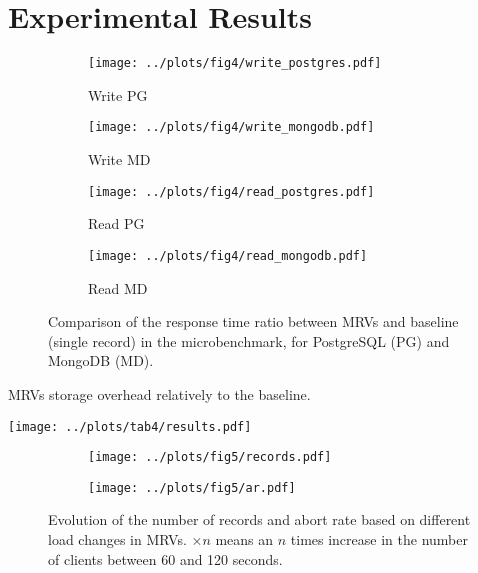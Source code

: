\documentclass[border=2cm]{standalone}
\begin{document}
\begin{minipage}{17cm}

\section*{Experimental Results}

\setcounter{figure}{3}
\begin{figure}[h]
    \centering
    \begin{subfigure}{.245\linewidth}
        \centering
        \texttt{[image: ../plots/fig4/write\_postgres.pdf]}
        \caption{Write PG}
    \end{subfigure}
    \begin{subfigure}{.245\linewidth}
        \centering
        \texttt{[image: ../plots/fig4/write\_mongodb.pdf]}
        \caption{Write MD}
    \end{subfigure}
    \begin{subfigure}{.245\linewidth}
        \centering
        \texttt{[image: ../plots/fig4/read\_postgres.pdf]}
        \caption{Read PG}
    \end{subfigure}
    \begin{subfigure}{.245\linewidth}
        \centering
        \texttt{[image: ../plots/fig4/read\_mongodb.pdf]}
        \caption{Read MD}
    \end{subfigure}
    \caption{Comparison of the response time ratio between MRVs and baseline (single record) in the microbenchmark, for PostgreSQL (PG) and MongoDB (MD).}
\end{figure}

\vspace{1cm}

\setcounter{table}{3}
\begin{table}[t]
	\centering
	\caption{MRVs storage overhead relatively to the baseline.}
	\texttt{[image: ../plots/tab4/results.pdf]}
\end{table}

\vspace{1cm}

\begin{figure}[h]
    \centering
    \begin{subfigure}{.35\linewidth}
        \centering
        \texttt{[image: ../plots/fig5/records.pdf]}
    \end{subfigure}
    \begin{subfigure}{.35\linewidth}
        \centering
        \texttt{[image: ../plots/fig5/ar.pdf]}
    \end{subfigure}
    \caption{Evolution of the number of records and abort rate based on different load changes in MRVs.
    \normalfont \small $\times n$ means an $n$ times increase in the number of clients between 60 and 120 seconds.}
\end{figure}


\end{minipage}
\end{document}
